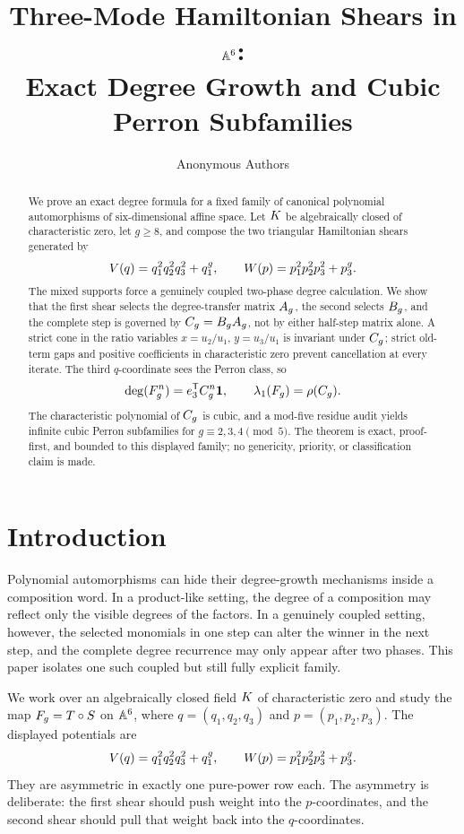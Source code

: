 \documentclass[11pt]{article}
\title{\textbf{Three-Mode Hamiltonian Shears in \(\mathbb{A}^6\):}\\
Exact Degree Growth and Cubic Perron Subfamilies}
\author{Anonymous Authors}
\date{}
\theoremstyle{remark}
\numberwithin{equation}{section}
\begin{document}
\maketitle

\begin{abstract}
We prove an exact degree formula for a fixed family of canonical polynomial
automorphisms of six-dimensional affine space.  Let \(K\) be algebraically
closed of characteristic zero, let \(g\geq 8\), and compose the two
triangular Hamiltonian shears generated by
\[
V(q)=q_1^2q_2^2q_3^2+q_1^g,
\qquad
W(p)=p_1^2p_2^2p_3^2+p_3^g.
\]
The mixed supports force a genuinely coupled two-phase degree calculation.
We show that the first shear selects the degree-transfer matrix
\(A_g\), the second selects \(B_g\), and the complete step is governed by
\(C_g=B_gA_g\), not by either half-step matrix alone.  A strict cone in the
ratio variables \(x=u_2/u_1\), \(y=u_3/u_1\) is invariant under \(C_g\);
strict old-term gaps and positive coefficients in characteristic zero prevent
cancellation at every iterate.  The third \(q\)-coordinate sees the Perron
class, so
\[
\operatorname{deg}(F_g^n)=e_3^{\mathsf T}C_g^n\mathbf{1},\qquad
\lambda_1(F_g)=\rho(C_g).
\]
The characteristic polynomial of \(C_g\) is cubic, and a mod-five residue
audit yields infinite cubic Perron subfamilies for \(g\equiv 2,3,4 \pmod 5\).
The theorem is exact, proof-first, and bounded to this displayed family; no
genericity, priority, or classification claim is made.
\end{abstract}

\section{Introduction}\label{sec:introduction}

Polynomial automorphisms can hide their degree-growth mechanisms inside a
composition word.  In a product-like setting, the degree of a composition may
reflect only the visible degrees of the factors.  In a genuinely coupled
setting, however, the selected monomials in one step can alter the winner in the
next step, and the complete degree recurrence may only appear after two phases.
This paper isolates one such coupled but still fully explicit family.

We work over an algebraically closed field \(K\) of characteristic zero and
study the map \(F_g=T\circ S\) on \(\mathbb{A}^6\), where \(q=(q_1,q_2,q_3)\) and
\(p=(p_1,p_2,p_3)\).  The displayed potentials are
\[
V(q)=q_1^2q_2^2q_3^2+q_1^g,\qquad
W(p)=p_1^2p_2^2p_3^2+p_3^g.
\]
They are asymmetric in exactly one pure-power row each.  The asymmetry is
deliberate: the first shear should push weight into the \(p\)-coordinates, and
the second shear should pull that weight back into the \(q\)-coordinates.
\end{document}
